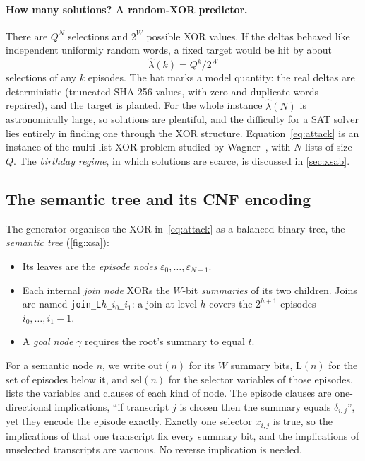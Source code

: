 \documentclass[11pt,a4paper]{article}
\newcommand{\outb}{\mathrm{out}}
\newcommand{\selv}{\mathrm{sel}}
\newcommand{\lv}{\mathrm{L}}
\begin{document}
\paragraph{How many solutions? A random-XOR predictor.}
There are $Q^N$ selections and $2^W$ possible XOR values. If the deltas behaved like
independent uniformly random words, a fixed target would be hit by about
\begin{equation}
\widehat{\lambda}(k) = Q^{k}/2^{W}
\label{eq:lambda}
\end{equation}
selections of any $k$ episodes. The hat marks a model quantity: the real deltas are
deterministic (truncated SHA-256 values, with zero and duplicate words repaired), and the
target is planted. For the whole instance $\widehat{\lambda}(N)$ is astronomically large, so
solutions are plentiful, and the difficulty for a SAT solver lies entirely in finding one
through the XOR structure. Equation~\eqref{eq:attack} is an instance of the multi-list XOR
problem studied by Wagner~\cite{wagner2002birthday}, with $N$ lists of size $Q$. The
\emph{birthday regime}, in which solutions are scarce, is discussed in \cref{sec:xsab}.

\subsection{The semantic tree and its CNF encoding}
\label{sec:encoding}
The generator organises the XOR in~\eqref{eq:attack} as a balanced binary tree, the
\emph{semantic tree} (\cref{fig:xsa}):
\begin{itemize}
\item Its leaves are the \emph{episode nodes} $\varepsilon_0,\dots,\varepsilon_{N-1}$.
\item Each internal \emph{join node} XORs the $W$-bit \emph{summaries} of its two children.
      Joins are named \texttt{join\_L$h$\_$i_0$\_$i_1$}: a join at level $h$ covers the
      $2^{h+1}$ episodes $i_0,\dots,i_1-1$.
\item A \emph{goal node} $\gamma$ requires the root's summary to equal $t$.
\end{itemize}
For a semantic node $n$, we write $\outb(n)$ for its $W$ summary bits, $\lv(n)$ for the set
of episodes below it, and $\selv(n)$ for the selector variables of those episodes.
 lists the variables and clauses of each kind of node.
The episode clauses are one-directional implications, ``if transcript $j$ is chosen then the
summary equals $\delta_{i,j}$'', yet they encode the episode exactly. Exactly one selector
$x_{i,j}$ is true, so the implications of that one transcript fix every summary bit, and the
implications of unselected transcripts are vacuous. No reverse implication is needed.
\end{document}
